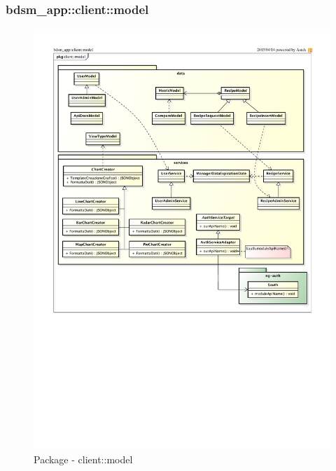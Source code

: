 %
%



\subsubsection{bdsm\_app::client::model} %
\label{ssub:bdsm_app_client_model}
\begin{figure}[htbp]
	\centering
	\centerline{\includegraphics[scale=1.02]{./images/client_model.pdf}}
	\caption{Package - client::model}
\end{figure}

